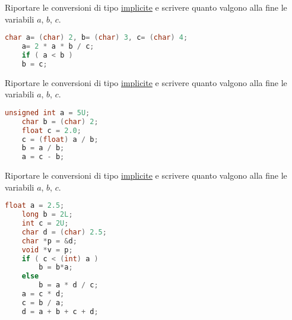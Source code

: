 \documentclass[addpoints,11pt]{exam}
\begin{document}
\boxedpoints
{}
\begin{center}
\end{center}

\vspace{5mm}

\noindent{}



\begin{questions} 

\question[1]
Riportare le conversioni di tipo \underline{implicite} e scrivere quanto valgono alla fine le variabili $a$, $b$, $c$.

\begin{minipage}[t]{0.5\linewidth}
	\begin{lstlisting}[language=C]
	char a= (char) 2, b= (char) 3, c= (char) 4;
	a= 2 * a * b / c;
	if ( a < b ) 
	b = c;\end{lstlisting}
\end{minipage}
\begin{minipage}[t]{0.5\linewidth}
	\makeemptybox{50pt}
\end{minipage}



\question[2]
Riportare le conversioni di tipo \underline{implicite} e scrivere quanto valgono alla fine le variabili $a$, $b$, $c$.

\begin{minipage}[t]{0.5\linewidth}
	\begin{lstlisting}[language=C]
	unsigned int a = 5U;
	char b = (char) 2;
	float c = 2.0;
	c = (float) a / b;
	b = a / b;
	a = c - b;\end{lstlisting}
\end{minipage}
\begin{minipage}[t]{0.5\linewidth}
	\makeemptybox{70pt}
\end{minipage}



\question[4]
Riportare le conversioni di tipo \underline{implicite} e scrivere quanto valgono alla fine le variabili $a$, $b$, $c$.

\begin{minipage}[t]{0.5\linewidth}
	\begin{lstlisting}[language=C]
	float a = 2.5;
	long b = 2L;
	int c = 2U;
	char d = (char) 2.5;
	char *p = &d;
	void *v = p;
	if ( c < (int) a )
	    b = b*a;
	else
	    b = a * d / c;
	a = c * d;
	c = b / a;
	d = a + b + c + d;\end{lstlisting}
\end{minipage}
\begin{minipage}[t]{0.5\linewidth}
	\makeemptybox{145pt}
\end{minipage}




\end{questions}
\end{document}
